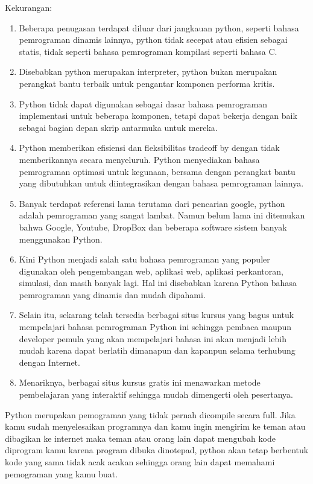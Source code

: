 Kekurangan:
\begin{enumerate}
\item Beberapa penugasan terdapat diluar dari jangkauan python, seperti bahasa pemrograman dinamis lainnya, python tidak secepat atau efisien sebagai statis, tidak seperti bahasa pemrograman kompilasi seperti bahasa C.
\item Disebabkan python merupakan interpreter, python bukan merupakan perangkat bantu terbaik untuk pengantar komponen performa kritis.
\item Python tidak dapat digunakan sebagai dasar bahasa pemrograman implementasi untuk beberapa komponen, tetapi dapat bekerja dengan baik sebagai bagian depan skrip antarmuka untuk mereka.
\item Python memberikan efisiensi dan fleksibilitas tradeoff by dengan tidak memberikannya secara menyeluruh. Python menyediakan bahasa pemrograman optimasi untuk kegunaan, bersama dengan perangkat bantu yang dibutuhkan untuk diintegrasikan dengan bahasa pemrograman lainnya.
\item Banyak terdapat referensi lama terutama dari pencarian google, python adalah pemrograman yang sangat lambat. Namun belum lama ini ditemukan bahwa Google, Youtube, DropBox dan beberapa software sistem banyak menggunakan Python.
\item Kini Python menjadi salah satu bahasa pemrograman yang populer digunakan oleh pengembangan web, aplikasi web, aplikasi perkantoran, simulasi, dan masih banyak lagi. Hal ini disebabkan karena Python bahasa pemrograman yang dinamis dan mudah dipahami.
\item Selain itu, sekarang telah tersedia berbagai situs kursus yang bagus untuk mempelajari bahasa pemrograman Python ini sehingga pembaca maupun developer pemula yang akan mempelajari bahasa ini akan menjadi lebih mudah karena dapat berlatih dimanapun dan kapanpun selama terhubung dengan Internet.
\item Menariknya, berbagai situs kursus gratis ini menawarkan metode pembelajaran yang interaktif sehingga mudah dimengerti oleh pesertanya.
\end{enumerate}

Python merupakan pemograman yang tidak pernah dicompile secara full. Jika kamu sudah menyelesaikan programnya dan kamu ingin mengirim ke teman atau dibagikan ke internet maka teman atau orang lain dapat mengubah kode diprogram kamu karena program dibuka dinotepad, python akan tetap berbentuk kode yang sama tidak acak acakan sehingga orang lain dapat memahami pemograman yang kamu buat.

